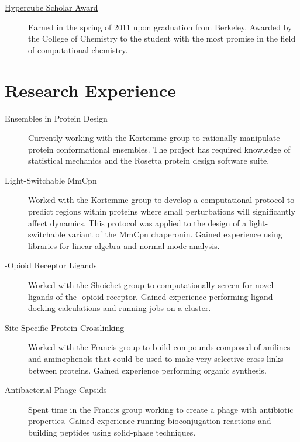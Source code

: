 \documentclass{article}
\begin{document}
  \begin{description}
   \item[\href{http://chemistry.berkeley.edu/commencement/address/pdf/commencement-program-2011.pdf}{Hypercube 
   Scholar Award}] Earned in the spring of 2011 upon graduation from Berkeley.  
   Awarded by the College of Chemistry to the student with the most promise in 
   the field of computational chemistry.
  \end{description}

 \section*{Research Experience}

  \begin{description}
   \item[Ensembles in Protein Design] Currently working with the Kortemme group 
   to rationally manipulate protein conformational ensembles.  The project has 
   required knowledge of statistical mechanics and the Rosetta protein design 
   software suite.
   
   \item[Light-Switchable MmCpn] Worked with the Kortemme group to develop a 
   computational protocol to predict regions within proteins where small 
   perturbations will significantly affect dynamics.  This protocol was applied 
   to the design of a light-switchable variant of the MmCpn chaperonin.  Gained 
   experience using libraries for linear algebra and normal mode analysis.

   \item[\textkappa{}-Opioid Receptor Ligands] Worked with the Shoichet group 
   to computationally screen for novel ligands of the \textkappa{}-opioid 
   receptor.  Gained experience performing ligand docking calculations and 
   running jobs on a cluster.

   \item[Site-Specific Protein Crosslinking] Worked with the Francis group to 
   build compounds composed of anilines and aminophenols that could be used to 
   make very selective cross-links between proteins.  Gained experience 
   performing organic synthesis.

   \item[Antibacterial Phage Capsids] Spent time in the Francis
   group working to create a phage with antibiotic properties.  Gained
   experience running bioconjugation reactions and building peptides using
   solid-phase techniques.
  \end{description}
\end{document}
